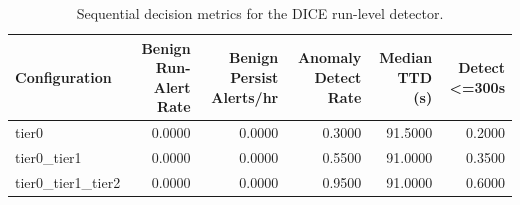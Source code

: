 \begin{table}[t]
\centering
\caption{Sequential decision metrics for the DICE run-level detector.}
\label{tab:dice_sequential_metrics}
\footnotesize
\begin{tabular}{lrrrrr}
\toprule
Configuration & Benign Run-Alert Rate & Benign Persist Alerts/hr & Anomaly Detect Rate & Median TTD (s) & Detect <=300s \\
\midrule
tier0 & 0.0000 & 0.0000 & 0.3000 & 91.5000 & 0.2000 \\
tier0_tier1 & 0.0000 & 0.0000 & 0.5500 & 91.0000 & 0.3500 \\
tier0_tier1_tier2 & 0.0000 & 0.0000 & 0.9500 & 91.0000 & 0.6000 \\
\bottomrule
\end{tabular}

\end{table}
